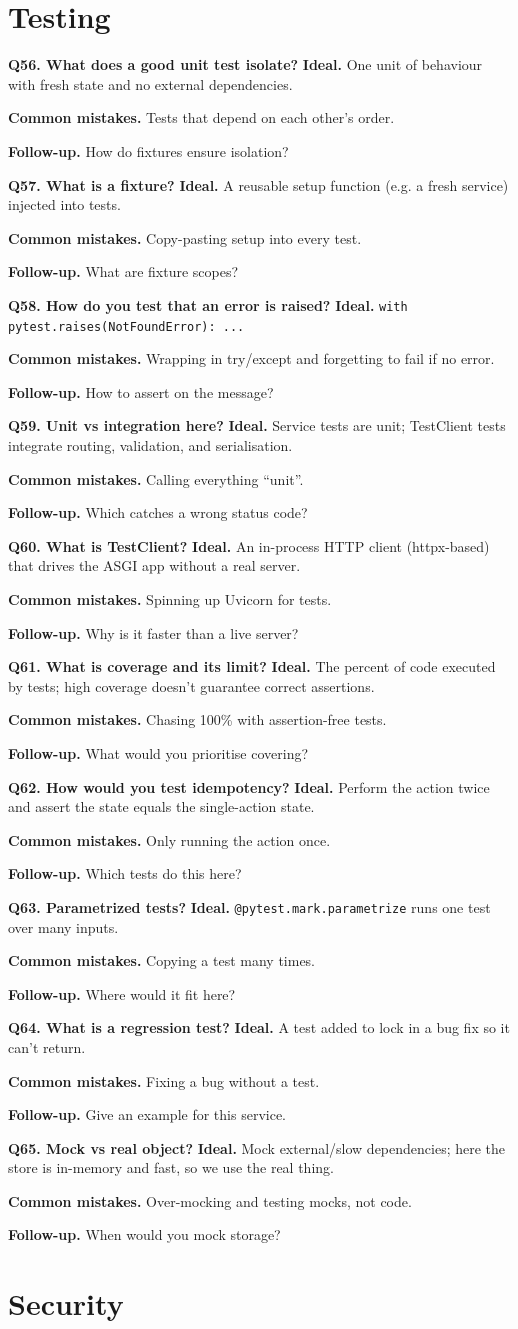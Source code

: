 \documentclass[11pt,a4paper]{report}
\newcommand{\qa}[3]{%
  \textbf{Ideal.} #1\par
  \textbf{Common mistakes.} #2\par
  \textbf{Follow-up.} #3\par
  \vspace{4pt}
}
\begin{document}
\section{Testing}

\textbf{Q56. What does a good unit test isolate?}
\qa{One unit of behaviour with fresh state and no external dependencies.}
{Tests that depend on each other's order.}
{How do fixtures ensure isolation?}

\textbf{Q57. What is a fixture?}
\qa{A reusable setup function (e.g. a fresh service) injected into tests.}
{Copy-pasting setup into every test.}
{What are fixture scopes?}

\textbf{Q58. How do you test that an error is raised?}
\qa{\texttt{with pytest.raises(NotFoundError): ...}}
{Wrapping in try/except and forgetting to fail if no error.}
{How to assert on the message?}

\textbf{Q59. Unit vs integration here?}
\qa{Service tests are unit; TestClient tests integrate routing, validation, and
serialisation.}
{Calling everything ``unit''.}
{Which catches a wrong status code?}

\textbf{Q60. What is TestClient?}
\qa{An in-process HTTP client (httpx-based) that drives the ASGI app without a
real server.}
{Spinning up Uvicorn for tests.}
{Why is it faster than a live server?}

\textbf{Q61. What is coverage and its limit?}
\qa{The percent of code executed by tests; high coverage doesn't guarantee correct
assertions.}
{Chasing 100\% with assertion-free tests.}
{What would you prioritise covering?}

\textbf{Q62. How would you test idempotency?}
\qa{Perform the action twice and assert the state equals the single-action state.}
{Only running the action once.}
{Which tests do this here?}

\textbf{Q63. Parametrized tests?}
\qa{\texttt{@pytest.mark.parametrize} runs one test over many inputs.}
{Copying a test many times.}
{Where would it fit here?}

\textbf{Q64. What is a regression test?}
\qa{A test added to lock in a bug fix so it can't return.}
{Fixing a bug without a test.}
{Give an example for this service.}

\textbf{Q65. Mock vs real object?}
\qa{Mock external/slow dependencies; here the store is in-memory and fast, so we
use the real thing.}
{Over-mocking and testing mocks, not code.}
{When would you mock storage?}

\section{Security}
\end{document}
